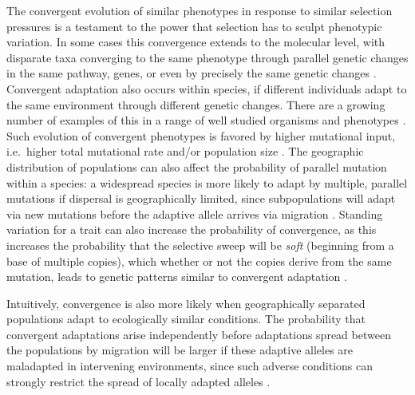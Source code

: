 \documentclass{article}
\newcommand{\citep}[1]{\cite{#1}}
\begin{document}
The convergent evolution of similar phenotypes 
in response to similar selection pressures is a testament to the power that selection 
has to sculpt phenotypic variation. 
In some cases this convergence extends to the molecular level, 
with disparate taxa converging to the same phenotype through parallel 
genetic changes in the same pathway, genes, 
or even by precisely the same genetic changes
\citep{stern2013genetic,zhen2012parallel,martin2013repeated}. 
Convergent adaptation also occurs within species, if different individuals
adapt to the same environment through different genetic changes. 
There are a growing number of examples of this in a range of well studied organisms and phenotypes \citep{Arendt:08}.
Such evolution of convergent phenotypes is favored by higher mutational input, 
i.e.\ higher total mutational rate and/or population size \citep{softsweepsII}.
The geographic distribution of populations can also affect the probability of parallel mutation within a species:
a widespread species is more likely to adapt by multiple, parallel mutations if dispersal is geographically limited, 
since subpopulations will adapt via new mutations before the adaptive allele arrives via migration \citep{ralph2010parallel}. 
Standing variation for a trait can also increase the probability of convergence, 
as this increases the probability that the selective sweep will be \emph{soft}
(beginning from a base of multiple copies),
which whether or not the copies derive from the same mutation,
leads to genetic patterns similar to convergent adaptation \citep{orr2001sieve,softsweepsI}. 

Intuitively, convergence is also more likely 
when geographically separated populations adapt to ecologically similar conditions. 
The probability that convergent adaptations arise independently
before adaptations spread between the populations by migration
will be larger if these adaptive alleles are maladapted in intervening environments,
since such adverse conditions can strongly restrict the spread of locally adapted alleles \citep{slatkin1973geneflow}.
 
\end{document}
